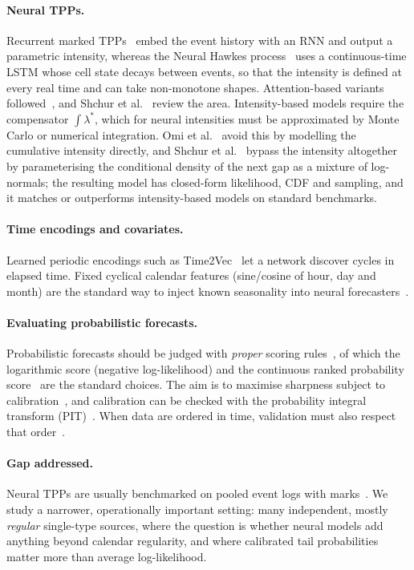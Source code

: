 \documentclass[10pt,twocolumn]{article}
\begin{document}
\paragraph{Neural TPPs.} Recurrent marked TPPs~\citep{du2016recurrent} embed the event history with an
RNN and output a parametric intensity, whereas the Neural Hawkes process~\citep{mei2017neural} uses a
continuous-time LSTM whose cell state decays between events, so that the intensity is defined at
every real time and can take non-monotone shapes. Attention-based variants
followed~\citep{zuo2020transformer,zhang2020self}, and Shchur et al.~\citep{shchur2021neural} review the area.
Intensity-based models require the compensator $\int\lambda^*$, which for neural intensities must be
approximated by Monte Carlo or numerical integration. Omi et al.~\citep{omi2019fully} avoid this by modelling
the cumulative intensity directly, and Shchur et al.~\citep{shchur2020intensity} bypass the intensity altogether by
parameterising the conditional density of the next gap as a mixture of log-normals; the resulting
model has closed-form likelihood, CDF and sampling, and it matches or outperforms intensity-based
models on standard benchmarks.

\paragraph{Time encodings and covariates.} Learned periodic encodings such as Time2Vec~\citep{kazemi2019time2vec}
let a network discover cycles in elapsed time. Fixed cyclical calendar features (sine/cosine of hour,
day and month) are the standard way to inject known seasonality into neural
forecasters~\citep{salinas2020deepar}.

\paragraph{Evaluating probabilistic forecasts.} Probabilistic forecasts should be judged with
\emph{proper} scoring rules~\citep{gneiting2007strictly}, of which the logarithmic score (negative
log-likelihood) and the continuous ranked probability score~\citep{matheson1976scoring} are the
standard choices. The aim is to maximise sharpness subject to
calibration~\citep{gneiting2007probabilistic}, and calibration can be checked with the probability
integral transform (PIT)~\citep{dawid1984present}. When data are ordered in time, validation must
also respect that order~\citep{tashman2000out,bergmeir2012use}.

\paragraph{Gap addressed.} Neural TPPs are usually benchmarked on pooled event logs with
marks~\citep{shchur2021neural}. We study a narrower, operationally important setting: many
independent, mostly \emph{regular} single-type sources, where the question is whether neural models
add anything beyond calendar regularity, and where calibrated tail probabilities matter more than
average log-likelihood.
\end{document}
